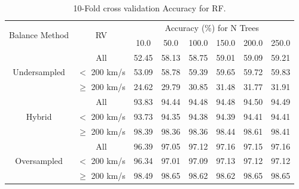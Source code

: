 \documentclass[trackchanges, floatfix, twocolumn, tighten]{aastex62}
\begin{document}
\begin{table}
\centering
\caption{10-Fold cross validation Accuracy for RF.}
\label{tab:RFD}
	\begin{tabular}{|c|c|c|c|c|c|c|c|}
		\hline
		\multirow{2}{*}{Balance Method} & \multirow{2}{*}{RV} & \multicolumn{6}{c|}{Accuracy (\%) for N Trees} \\ 
		  & &   10.0 &   50.0 &   100.0 &   150.0 &   200.0 &   250.0 \\ \hline \hline
		  \multirow{3}{*}{Undersampled} & All &  52.45 &  58.13 &   58.75 &   59.01 &   59.09 &   59.21 \\ \cline{2-8}
			& $<$ 200 km/s &  53.09 &  58.78 &   59.39 &   59.65 &   59.72 &   59.83 \\ \cline{2-8}
			& $\geq$ 200 km/s	 &  24.62 &  29.79 &   30.85 &   31.48 &   31.77 &   31.91 \\ \hline \hline
		  \multirow{3}{*}{Hybrid} & All      &  93.83 &  94.44 &   94.48 &   94.48 &   94.50 &   94.49 \\ \cline{2-8}
			& $<$ 200 km/s      &  93.73 &  94.35 &   94.38 &   94.39 &   94.41 &   94.41 \\ \cline{2-8}
			& $\geq$ 200 km/s&  98.39 &  98.36 &   98.36 &   98.44 &   98.61 &   98.41 \\ \hline \hline
		  \multirow{3}{*}{Oversampled} & All  &  96.39 &  97.05 &   97.12 &   97.16 &  97.15       &   97.16      \\ \cline{2-8}
			& $<$ 200 km/s &  96.34 &  97.01 &   97.09 &   97.13 &  97.12       &   97.12      \\ \cline{2-8}
			& $\geq$ 200 km/s	&  98.49 &  98.65 &   98.62 &   98.62 &  98.65      &   98.65      \\ \hline 
	\end{tabular}
\end{table}
\end{document}
